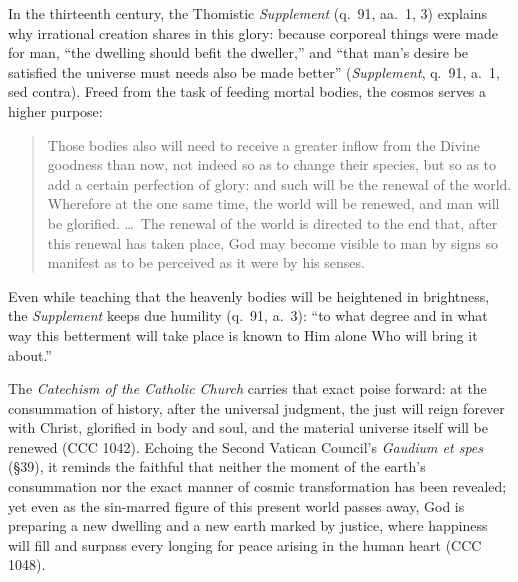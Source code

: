 In the thirteenth century, the Thomistic \textit{Supplement} (q.\ 91, aa.\ 1, 3) explains why irrational creation shares in this glory: because corporeal things were made for man, ``the dwelling should befit the dweller,'' and ``that man's desire be satisfied the universe must needs also be made better'' (\textit{Supplement}, q.\ 91, a.\ 1, sed contra). Freed from the task of feeding mortal bodies, the cosmos serves a higher purpose:

\begin{quote}
Those bodies also will need to receive a greater inflow from the Divine goodness than now, not indeed so as to change their species, but so as to add a certain perfection of glory: and such will be the renewal of the world. Wherefore at the one same time, the world will be renewed, and man will be glorified. \dots\ The renewal of the world is directed to the end that, after this renewal has taken place, God may become visible to man by signs so manifest as to be perceived as it were by his senses.
\end{quote}

Even while teaching that the heavenly bodies will be heightened in brightness, the \textit{Supplement} keeps due humility (q.\ 91, a.\ 3): ``to what degree and in what way this betterment will take place is known to Him alone Who will bring it about.''

The \textit{Catechism of the Catholic Church} carries that exact poise forward: at the consummation of history, after the universal judgment, the just will reign forever with Christ, glorified in body and soul, and the material universe itself will be renewed (CCC 1042). Echoing the Second Vatican Council's \textit{Gaudium et spes} (\S 39), it reminds the faithful that neither the moment of the earth's consummation nor the exact manner of cosmic transformation has been revealed; yet even as the sin-marred figure of this present world passes away, God is preparing a new dwelling and a new earth marked by justice, where happiness will fill and surpass every longing for peace arising in the human heart (CCC 1048).
